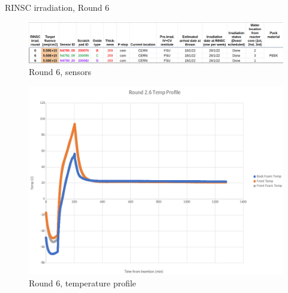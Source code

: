 \documentclass{beamer}
\begin{document}
\begin{frame}{RINSC irradiation, Round 6}

    \begin{figure}
        \includegraphics[width=.7\textwidth]{plots/Round_6_sensors.png}
        \caption{Round 6, sensors}
    \end{figure}
    \begin{figure}
      \includegraphics[width=.5\textwidth]{plots/Round6_temp_profile.png}
      \caption{Round 6, temperature profile}
    \end{figure}
\end{frame}



\end{document}
